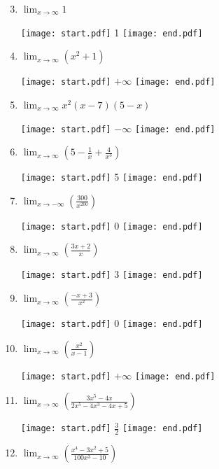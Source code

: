 \documentclass[12pt]{article}
\begin{document}
\begin{enumerate}
\setcounter{enumi}{2}

\item $\displaystyle \lim_{x\rightarrow \infty}{1}$

\texttt{[image: start.pdf]}
{{1}}
\texttt{[image: end.pdf]}


\item $\displaystyle \lim_{x\rightarrow \infty}{\left(x^2+1\right)}$ 

\texttt{[image: start.pdf]}
{{$+\infty$}}
\texttt{[image: end.pdf]}


\item $\displaystyle \lim_{x \rightarrow \infty}{x^2(x-7)(5-x)}$

\texttt{[image: start.pdf]}
{{$-\infty$}}
\texttt{[image: end.pdf]}


\item $\displaystyle \lim_{x\rightarrow \infty}{\left(5-\frac{1}{x}+\frac{4}{x^3}\right)}$

\texttt{[image: start.pdf]}
{{5}}
\texttt{[image: end.pdf]}


\item $\displaystyle \lim_{x\rightarrow -\infty}{\left(\frac{300}{x^{200}}\right)}$

\texttt{[image: start.pdf]}
{{0}}
\texttt{[image: end.pdf]}


\item  $\displaystyle \lim_{x\rightarrow \infty}{\left(\frac{3x+2}{x}\right)}$ 

\texttt{[image: start.pdf]}
{{3}}
\texttt{[image: end.pdf]}


\item  $\displaystyle \lim_{x\rightarrow \infty}{\left(\frac{-x+3}{x^2}\right)}$

\texttt{[image: start.pdf]}
{{0}}
\texttt{[image: end.pdf]}


\item  $\displaystyle \lim_{x\rightarrow \infty}{\left(\frac{x^2}{x-1}\right)}$

\texttt{[image: start.pdf]}
{{$+\infty$}}
\texttt{[image: end.pdf]}


\item  $\displaystyle \lim_{x\rightarrow \infty}{\left(\frac{3x^5-4x}{2x^5-4x^3-4x+5}\right)}$

\texttt{[image: start.pdf]}
{{$\displaystyle \frac{3}{2}$}}
\texttt{[image: end.pdf]}


\item  $\displaystyle \lim_{x\rightarrow \infty}{\left(\frac{x^4-3x^2+5}{100x^3-10}\right)}$


\end{enumerate}
\end{document}
